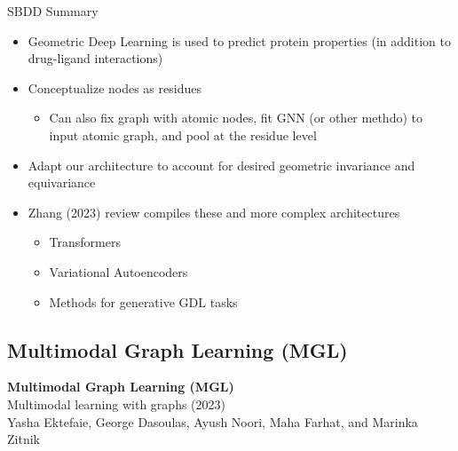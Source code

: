 \documentclass{beamer}
\begin{document}
\begin{frame}{SBDD Summary}
    \begin{itemize}\setlength\itemsep{6mm}
        \item Geometric Deep Learning is used to predict protein properties (in addition to drug-ligand interactions)
        \item Conceptualize nodes as residues 
        \begin{itemize}
            \item Can also fix graph with atomic nodes, fit GNN (or other methdo) to input atomic graph, and pool at the residue level  
        \end{itemize}
        \item Adapt our architecture to account for desired geometric invariance and equivariance 
        \item Zhang (2023) \cite{zhang_systematic_2023} review compiles these and more complex architectures
        \begin{itemize}
            \item Transformers 
            \item Variational Autoencoders 
            \item Methods for generative GDL tasks 
        \end{itemize}
    \end{itemize}
\end{frame}



\subsection{Multimodal Graph Learning (MGL)}


\begin{frame}{}
    \textbf{\Large Multimodal Graph Learning (MGL)}  \\
    \vspace{5mm}
    Multimodal learning with graphs (2023) \\ Yasha Ektefaie, George Dasoulas, Ayush Noori, Maha Farhat, and Marinka Zitnik
\end{frame}
\end{document}
